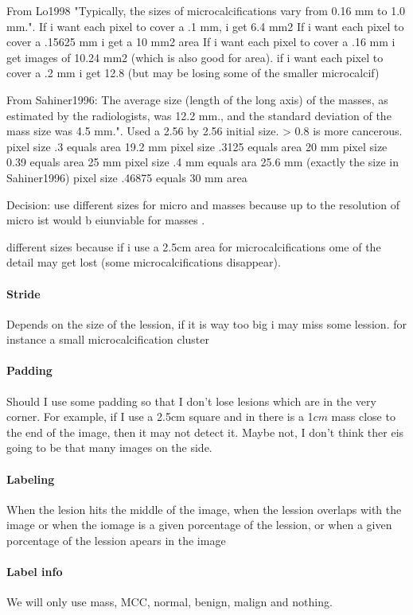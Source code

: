 From Lo1998 "Typically, the sizes of microcalcifications vary from 0.16 mm to 1.0 mm.".
If i want each pixel to cover a .1 mm, i get 6.4 mm2
If i want each pixel to cover a .15625 mm i get a 10 mm2 area
If i want each pixel to cover a .16 mm i get images of 10.24 mm2 (which is also good for area).
if i want each pixel to cover a .2 mm i get 12.8 (but may be losing some of the smaller microcalcif)

From Sahiner1996: The average size (length of the long axis) of the masses, as estimated by the radiologists, was 12.2 mm., and the standard deviation of the mass size was 4.5 mm.". Used a 2.56 by 2.56 initial size. > 0.8 is more cancerous.
pixel size .3 equals area 19.2 mm
pixel size .3125 equals area 20 mm
pixel size 0.39 equals area 25 mm
pixel size .4 mm equals ara 25.6 mm (exactly the size in Sahiner1996)
pixel size .46875 equals 30 mm area

Decision: use different sizes for micro and masses because up to the resolution of micro ist would b eiunviable for masses .

different sizes because if i use a 2.5cm area for microcalcifications ome of the detail may get lost (some microcalcifications disappear).

\paragraph{Stride}
Depends on the size of the lession, if it is way too big i may miss some lession. for instance a small microcalcification cluster

\paragraph{Padding}
Should I use some padding so that I don't lose lesions which are in the very corner. For example, if I use a 2.5cm square and in there is a 1$cm$ mass close to the end of the image, then it may not detect it. Maybe not, I don't think ther eis going to be that many images on the side.

\paragraph{Labeling}
When the lesion hits the middle of the image, when the lession overlaps with the image or when the iomage is a given porcentage of the lession, or when a given porcentage of the lession apears in the image

\paragraph{Label info}
We will only use mass, MCC, normal, benign, malign and nothing.

